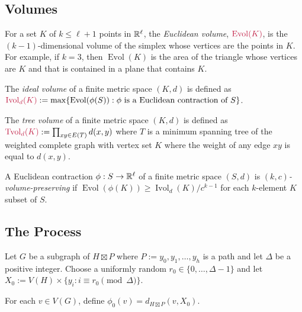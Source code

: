 \documentclass{patmorin}
\makeatletter
\newcommand{\defin}[1]{\emph{\textcolor{brightmaroon}{#1}}}
\def\mathcolor#1#{\@mathcolor{#1}}
\def\@mathcolor#1#2#3{%
  \protect\leavevmode
  \begingroup
    \color#1{#2}#3%
  \endgroup
}
\newcommand{\mathdefin}[1]{\mathcolor{brightmaroon}{#1}}
\DeclareMathOperator{\evol}{Evol}
\DeclareMathOperator{\ivol}{Ivol}
\DeclareMathOperator{\tvol}{Tvol}
\makeatother
\begin{document}
\subsection{Volumes}

For a set $K$ of $k\le \ell+1$ points in $\mathbb{R}^\ell$, the \defin{Euclidean volume}, $\mathdefin{\evol(K)}$, is the $(k-1)$-dimensional volume of the simplex whose vertices are the points in $K$.  For example, if $k=3$, then $\evol(K)$ is the area of the triangle whose vertices are $K$ and that is contained in a plane that contains $K$.

The \defin{ideal volume} of a finite metric space $(K,d)$ is defined as $\mathdefin{\ivol_d(K)}:=\max\{\evol(\phi(S)):\text{$\phi$ is a Euclidean contraction of $S$}\}$.

The \defin{tree volume} of a finite metric space $(K,d)$ is defined as $\mathdefin{\tvol_d(K)}:=\prod_{xy\in E(T)} d(x,y)$ where $T$ is a minimum spanning tree of the weighted complete graph with vertex set $K$ where the weight of any edge $xy$ is equal to $d(x,y)$.

A Euclidean contraction $\phi:S\to\mathbb{R}^{\ell}$ of a finite metric space $(S,d)$ is \defin{$(k,c)$-volume-preserving} if $\evol(\phi(K))\ge \ivol_d(K)/c^{k-1}$ for each $k$-element $K$ subset of $S$.

\subsection{The Process}

Let $G$ be a subgraph of $H\boxtimes P$ where $P:=y_0,y_1,\ldots,y_h$ is a path and let $\Delta$ be a positive integer.  Choose a uniformly random $r_0\in \{0,\ldots,\Delta-1\}$ and let $X_0:=V(H)\times\{y_i:i\equiv r_0\pmod\Delta\}$.

For each $v\in V(G)$, define $\phi_0(v)=d_{H\boxtimes P}(v,X_0)$.
\end{document}
